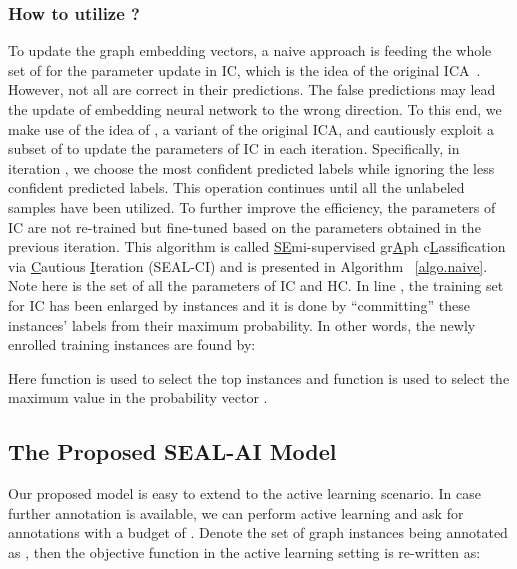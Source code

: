 \documentclass[sigconf]{acmart}
\newcommand{\eat}[1]{}
\begin{document}
\subsubsection{How to utilize ?}
To update the graph embedding vectors, a naive approach is feeding the whole set of  for the parameter update in IC, which is the idea of the original ICA~\cite{sen2008collective}.  However, not all  are correct in their predictions.  The false predictions may lead the update of embedding neural network to the wrong direction. \eat{Within the set of unlabeled graphs, different  could contribute differently to the update of embedding neural network.} To this end, we make use of the idea of \cite{mcdowell2007cautious}, a variant of the original ICA, and cautiously exploit a subset of  to update the parameters of IC in each iteration.  Specifically, in iteration , we choose the  most confident predicted labels while ignoring the less confident predicted labels.  This operation continues until all the unlabeled samples have been utilized.  To further improve the efficiency, the parameters of IC are not re-trained but fine-tuned based on the parameters obtained in the previous iteration.  This algorithm is called \underline{SE}mi-supervised gr\underline{A}ph c\underline{L}assification via \underline{C}autious \underline{I}teration (SEAL-CI) and is presented in Algorithm ~\ref{algo.naive}.  Note here  is the set of all the parameters of IC and HC. \eat{In line , we are sorting  by its maximum probability.} In line , the training set for IC has been enlarged by  instances and it is done by ``committing'' these instances' labels from their maximum probability.  In other words, the newly enrolled training instances are found by:

Here function  is used to select the top  instances and function  is used to select the maximum value in the probability vector .  \eat{By ``committing'' these instances, we turn a probability vector into its one-hot form.  For example, it transforms a vector of  into .}

\subsection{The Proposed SEAL-AI Model}\label{sec.ai}
Our proposed model is easy to extend to the active learning scenario.  In case further annotation is available, we can perform active learning and ask for annotations with a budget of .  Denote the set of graph instances being annotated as , then the objective function in the active learning setting is re-written as:
\end{document}
